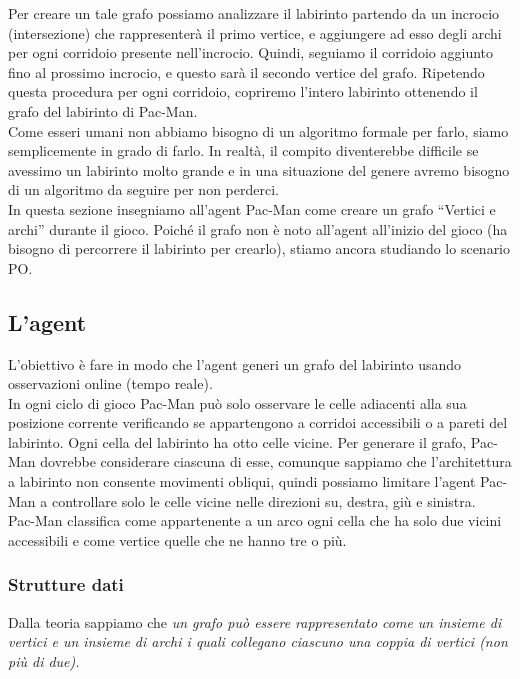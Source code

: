 \documentclass[8pt]{book}
\begin{document}
Per creare un tale grafo possiamo analizzare il labirinto partendo da un incrocio (intersezione) che rappresenterà il primo vertice, e aggiungere ad esso degli archi per ogni corridoio presente nell'incrocio. Quindi, seguiamo il corridoio aggiunto fino al prossimo incrocio, e questo sarà il secondo vertice del grafo. Ripetendo questa procedura per ogni corridoio, copriremo l'intero labirinto ottenendo il grafo del labirinto di Pac-Man.\\
Come esseri umani non abbiamo bisogno di un algoritmo formale per farlo, siamo semplicemente in grado di farlo. In realtà, il compito diventerebbe difficile se avessimo un labirinto molto grande e in una situazione del genere avremo bisogno di un algoritmo da seguire per non perderci.\\
In questa sezione insegniamo all'agent Pac-Man come creare un grafo ``Vertici e archi'' durante il gioco. Poiché il grafo non è noto all'agent all'inizio del gioco (ha bisogno di percorrere il labirinto per crearlo), stiamo ancora studiando lo scenario PO.

\subsection{L'agent}

L'obiettivo è fare in modo che l'agent generi un grafo del labirinto usando osservazioni online (tempo reale).\\
In ogni ciclo di gioco Pac-Man può solo osservare le celle adiacenti alla sua posizione corrente verificando se appartengono a corridoi accessibili o a pareti del labirinto. Ogni cella del labirinto ha otto celle vicine. Per generare il grafo, Pac-Man dovrebbe considerare ciascuna di esse, comunque sappiamo che l'architettura a labirinto non consente movimenti obliqui, quindi possiamo limitare l'agent Pac-Man a controllare solo le celle vicine nelle direzioni su, destra, giù e sinistra.\\
Pac-Man classifica come appartenente a un arco ogni cella che ha solo due vicini accessibili e come vertice quelle che ne hanno tre o più.

\subsubsection{Strutture dati}

Dalla teoria sappiamo che \emph{un grafo può essere rappresentato come un insieme di vertici e un insieme di archi i quali collegano ciascuno una coppia di vertici (non più di due).}
\end{document}
